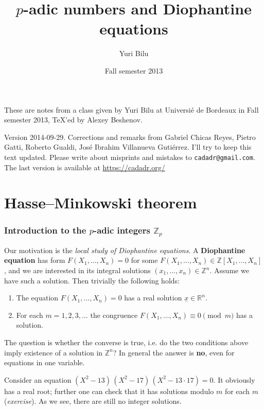 \documentclass{article}
\title{$p$-adic numbers and Diophantine equations}
\author{Yuri Bilu}
\date{Fall semester 2013}
\newcommand{\term}{\textbf}
\newcommand{\ZZ}{\mathbb{Z}}
\newcommand{\examplesymbol}{$\blacktriangle$}
\renewcommand{\qedsymbol}{$\blacksquare$}
\theoremstyle{myplain}
\theoremstyle{mydefinition}
\newenvironment{example}
  {\pushQED{\qed}\renewcommand{\qedsymbol}{\examplesymbol}\examplex}
  {\popQED\endexamplex}
\begin{document}
\maketitle

\noindent These are notes from a class given by Yuri Bilu at Universi\'e
de Bordeaux in Fall semester 2013, \TeX'ed by Alexey Beshenov.

Version 2014-09-29. Corrections and remarks from
Gabriel Chicas Reyes,
Pietro Gatti,
Roberto Gualdi,
Jos\'e Ibrahim Villanueva Guti\'errez.
I'll try to keep this text updated. Please write about misprints and mistakes to
\texttt{cadadr@gmail.com}. The last version is available at
\url{https://cadadr.org/}

\tableofcontents

\pagebreak

\part{Hasse--Minkowski theorem}

\section{Introduction to the $p$-adic integers $\ZZ_p$}
\label{section:Zp-intro}

Our motivation is the \emph{local study of Diophantine equations}.
A \term{Diophantine equation} has form $F (X_1,\ldots,X_n) = 0$ for some
$F (X_1,\ldots,X_n) \in \ZZ [X_1,\ldots,X_n]$, and we are interested in its
integral solutions $(x_1,\ldots,x_n) \in \ZZ^n$. Assume we have such a
solution. Then trivially the following holds:

\begin{enumerate}
\item The equation $F (X_1,\ldots,X_n) = 0$ has a real solution
  $\underline{x} \in \mathbb{R}^n$.

\item For each $m = 1, 2, 3, \ldots$ the congruence
  $F (X_1,\ldots,X_n) \equiv 0 \pmod{m}$ has a solution.
\end{enumerate}

The question is whether the converse is true, i.e. do the two conditions above
imply existence of a solution in $\ZZ^n$? In general the answer is \textbf{no},
even for equations in one variable.

\begin{example}
  Consider an equation $(X^2 - 13) \, (X^2 - 17) \, (X^2 - 13\cdot 17) = 0$.
  It obviously has a real root; further one can check that it has solutions
  modulo $m$ for each $m$ (\emph{exercise}). As we see, there are still no
  integer solutions.
\end{example}
\end{document}
